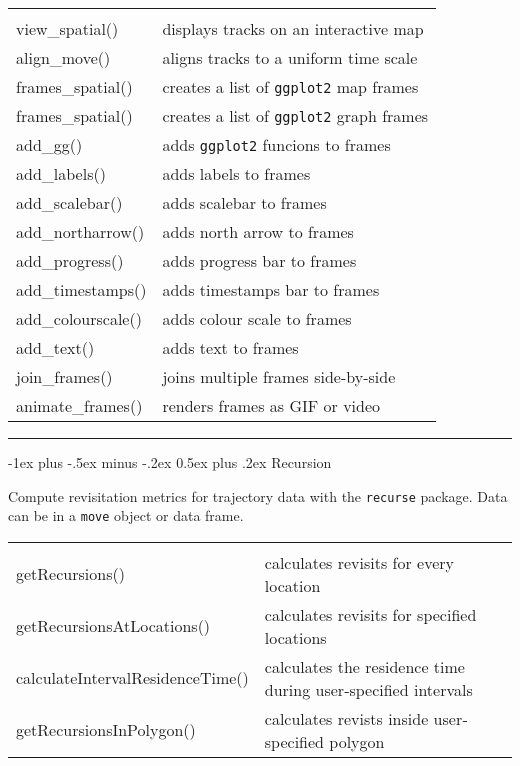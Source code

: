 \documentclass[a4paper,10pt,landscape]{article}
\makeatletter
\renewcommand{\section}{\@startsection{section}{1}{0mm}%
                                {-1ex plus -.5ex minus -.2ex}%
                                {0.5ex plus .2ex}%
                                {\normalfont\large\bfseries}}
\makeatother
\begin{document}
\begin{multicols}{3}
\begin{tabular}{@{}p{\the\MyLen}%
                @{}p{\linewidth-\the\MyLen}@{}}
                & \\
view\_spatial() & displays tracks on an interactive map \\
align\_move() & aligns tracks to a uniform time scale \\
frames\_spatial() & creates a list of \verb!ggplot2! map frames \\
frames\_spatial() & creates a list of \verb!ggplot2! graph frames \\
add\_gg() & adds \verb!ggplot2! funcions to frames \\
add\_labels() & adds labels to frames \\
add\_scalebar() & adds scalebar to frames \\
add\_northarrow() & adds north arrow to frames \\
add\_progress() & adds progress bar to frames \\
add\_timestamps() & adds timestamps bar to frames \\
add\_colourscale() & adds colour scale to frames \\
add\_text() & adds text to frames \\
join\_frames() & joins multiple frames side-by-side \\
animate\_frames() & renders frames as GIF or video \\
\end{tabular}

\quad
\rule{0.32\textwidth}{0.4pt}
\section{Recursion}

Compute revisitation metrics for trajectory data with the \verb!recurse! package.  Data can be in a \verb!move! object or data frame.

\begin{tabular}{@{}p{\the\MyLen + 20pt}%
                @{}p{\linewidth-\the\MyLen - 20pt}@{}}
                & \\
getRecursions() & calculates revisits for every location \\
getRecursionsAtLocations() &  calculates revisits for specified locations \\
calculateIntervalResidenceTime() &  calculates the residence time during user‐specified intervals \\
getRecursionsInPolygon() & calculates revists inside user‐specified polygon \\


\end{tabular}
\end{multicols}
\end{document}
